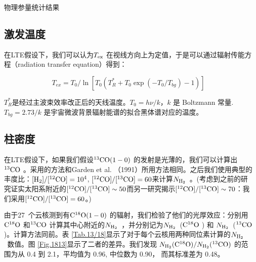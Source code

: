 \documentclass[UTF8, nocolorlinks]{pkuthss}
\newcommand{\cob}{$\rm ^{13}CO$ }
\newcommand{\coc}{$\rm C^{18}O$ }
\newcommand{\cobb}{$\rm^{13}CO(1-0)$ }
\newcommand{\cocc}{$\rm C^{18}O(1-0)$ }
\newcommand{\texc}{$T_{\rm {ex}}$ }
\newcommand{\nhyd}{$N_{\rm H_2}$\ }
\newcommand{\numcompofcores}{27\ }
\begin{document}
		\begin{table}
			\begin{footnotesize}
	        \begin{center}
	        \caption{物理参量统计结果\label{Tab.PhysicalParaStat}}

	        \setlength{\tabcolsep}{0.04in}
	        \vspace{0.5em}

	        

	        \end{center}
	        \end{footnotesize}
        \end{table}

        \subsection{激发温度}

	        在LTE假设下，我们可以认为\texc 在视线方向上为定值，于是可以通过辐射传能方程（radiation transfer equation）得到：

		    \begin{equation}
		    	T_{ex} = T_0 / \ln[T_0 (T^*_R + T_0 \exp{(-T_0/T_{bg})}-1)]
		    \end{equation}

		    $T^*_R$是经过主波束效率改正后的天线温度。$T_0 = h\nu /k$，$k$ 是 Boltzmann 常量. $T_{bg} = 2.73 /k$ 是宇宙微波背景辐射能谱的拟合黑体谱对应的温度。

		\subsection{柱密度}

			在LTE假设下，如果我们假设\cobb 的发射是光薄的，我们可以计算出\cob 。采用的方法和Garden et al. （1991）所用方法相同\supercite{1991ApJ...374..540G}。之后我们使用典型的丰度比：$\rm [H_2]/[ ^{12}CO]=10^4$,  $\rm [^{12}CO]/[^{13}CO]=60$来计算\nhyd。(考虑到之前的研究\supercite{1987ApJ...317..926H}证实太阳系附近的$\rm [^{12}CO]/[^{13}CO]\sim 50$而另一研究\supercite{1980Sci...208..663P}揭示$\rm [^{12}CO]/[^{13}CO]\sim 70$：我们采用$\rm [^{12}CO]/[^{13}CO]=60$。)

			由于\numcompofcores 个云核测到有\cocc 的辐射，我们检验了他们的光厚效应：分别用\coc 和\cob 计算其中心附近的\nhyd，并分别记为\nhyd(\coc) 和 \nhyd(\cob)。计算方法同前\supercite{1991ApJ...374..540G}。表 \ref{Tab.13/18}显示了对于每个云核用两种同位素计算的\nhyd 数值。图 \ref{Fig.1813}显示了二者的差异。我们发现 ${N_{\rm H_2}(\rm C^{18}O)}/{ N_{\rm H_2}(\rm ^{13}CO)}$ 的范围为从 0.4 到 2.1，平均值为 0.96, 中位数为 0.90， 而其标准差为 0.48。
\end{document}
